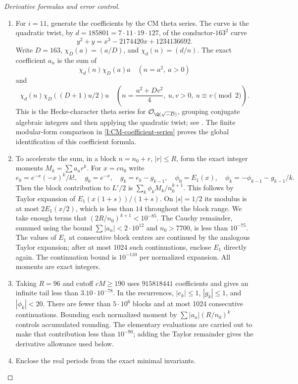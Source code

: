 \begin{proof}[Derivative formulas and error control]
\begin{enumerate}[label=\arabic*.,leftmargin=*]
\item For $i=11$, generate the coefficients by the CM theta series.
The curve is the quadratic twist, by
$d=185801=7\cdot11\cdot19\cdot127$, of the conductor-$163^2$
curve
\[
 y^2+y=x^3-2174420x+1234136692.
\]
Write $D=163$, $\chi_D(a)=(a/D)$, and $\chi_d(n)=(d/n)$.
The exact coefficient $a_n$ is the sum of
\[
 \chi_d(n)\chi_D(a)a \quad(n=a^2,\ a>0)
\]
and
\[
 \chi_d(n)\chi_D((D+1)u/2)u
 \quad\left(n=\frac{u^2+Dv^2}{4},\ u,v>0,
                           \ u\equiv v\pmod2\right).
\]
This is the Hecke-character theta series for
$\mathcal O_{\Q(\sqrt{-D})}$, grouping conjugate algebraic integers
and then applying the quadratic twist; see
\citet[\S3, pp.~4--5]{CrDarmon2009}. The finite modular-form comparison in \cref{I:CM-coefficient-series}
proves the global identification of this coefficient formula.

\item To accelerate the sum, in a block $n=n_0+r$, $|r|\leq R$, form the
exact integer moments $M_k=\sum a_nr^k$. For $x=cn_0$ write
\[
 e_k=e^{-x}(-x)^k/k!,\quad g_0=e^{-x},\quad
 g_k=e_k-g_{k-1},\quad
 \phi_0=E_1(x),\quad\phi_k=-\phi_{k-1}-g_{k-1}/k.
\]
Then the block contribution to $L'/2$ is
$\sum_k\phi_k M_k/n_0^{k+1}$. This follows by Taylor expansion
of $E_1(x(1+s))/(1+s)$. On $|s|=1/2$ its modulus is at most
$2E_1(x/2)$, which is less than $14$ throughout the block range.
We take enough terms that $(2R/n_0)^{k+1}<10^{-85}$.
The Cauchy remainder, summed using the bound
$\sum|a_n|<2\cdot10^{12}$ and $n_0>7700$, is less than
$10^{-75}$. The values of $E_1$ at consecutive block centres
are continued by the analogous Taylor expansion; after at most
1024 such continuations, enclose $E_1$ directly again.
The continuation bound is $10^{-110}$ per normalized expansion.
All moments are exact integers.

\item Taking $R=96$ and cutoff $cM\geq190$ uses
$915818441$ coefficients and gives an infinite tail less than
$3.10\cdot10^{-78}$. In the recurrences,
$|e_k|\leq1$, $|g_k|\leq1$, and $|\phi_k|<20$.
There are fewer than $5\cdot10^6$ blocks and at most 1024
consecutive continuations. Bounding each normalized moment by
$\sum|a_n|(R/n_0)^k$ controls accumulated rounding. The elementary evaluations are carried
out to make that contribution less than $10^{-90}$; adding the
Taylor remainder gives the derivative allowance used below.

\item Enclose the real periods from the exact minimal invariants.


\end{enumerate}
\end{proof}
